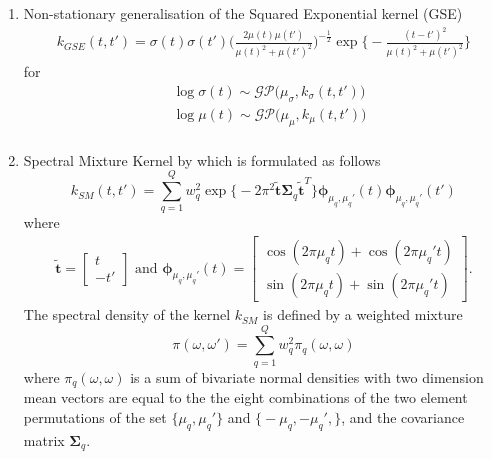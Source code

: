 \begin{enumerate}
\item Non-stationary generalisation of the Squared Exponential kernel (GSE)
\begin{align*}
k_{GSE}(t,t') = \sigma(t) \sigma(t') \bigg( \frac{2\mu(t) \mu(t')}{\mu(t)^2 +  \mu(t')^2}\bigg)^{-\frac{1}{2}} \exp \Big\{ - \frac{(t - t')^2}{\mu(t)^2 +  \mu(t')^2} \Big\}
\end{align*}
for
\begin{align*}
& \log \sigma(t) \sim \mathcal{GP} \Big(\mu_\sigma, k_\sigma (t,t') \Big) \\
& \log \mu(t) \sim \mathcal{GP} \Big(\mu_\mu, k_\mu (t,t') \Big) \\
\end{align*}

\item Spectral Mixture Kernel by \citep{Remes2017}
which is formulated as follows
\begin{equation}
k_{SM}(t,t') = \sum_{q = 1}^Q w_q^2 \exp \Big\{ - 2 \pi^2 \tilde{\mathbf{t}}\bm{\Sigma}_q\tilde{\mathbf{t}}^T\Big\} \bm{\phi}_{\mu_q,\mu_q'} (t) \bm{\phi}_{\mu_q,\mu_q'} (t')
\end{equation}
where
\begin{align*}
\tilde{\mathbf{t}} = \begin{bmatrix}
t \\
- t'
\end{bmatrix} \text{ and } \bm{\phi}_{\mu_q,\mu_q'}(t) = \begin{bmatrix}
\cos (2 \pi \mu_{q} t) + \cos (2 \pi \mu_{q}' t)\\
\sin (2 \pi \mu_{q} t) + \sin (2 \pi \mu_{q}' t)
\end{bmatrix}.
\end{align*}
The spectral density of the kernel $k_{SM}$ is defined by a weighted mixture
\begin{equation}
\pi(\omega,\omega') = \sum_{q = 1}^Q w_q^2 \pi_q(\omega,\omega)
\end{equation}
where $\pi_q(\omega,\omega)$ is a sum of bivariate normal densities with two dimension mean vectors are equal to the the eight combinations of the two element permutations of the set $\big\{\mu_q,\mu_q'\big\}$ and $\big\{-\mu_q,-\mu_q',  \big\}$, and the covariance matrix $\bm{\Sigma}_q$.


\end{enumerate}
